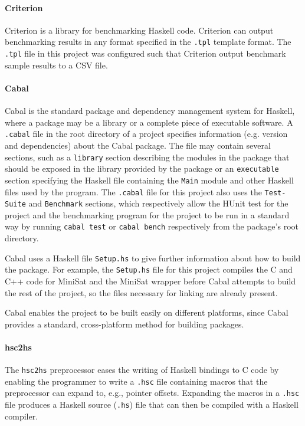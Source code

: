 \documentclass[12pt,a4paper,twoside,openright]{report}
\begin{document}
{\paragraph{Criterion}{
Criterion \cite{criterion} is a library for benchmarking Haskell code.
Criterion can output benchmarking results in any format specified in the \verb,.tpl,
template format. The \verb,.tpl, file in this project
was configured such that Criterion output benchmark sample results to a
CSV file.}

\paragraph{Cabal}{
Cabal \cite{cabal} is the standard package and dependency management system for Haskell,
where a package may be a library or a complete piece of executable software.
A \verb,.cabal, file in the root directory of a project specifies
information (e.g. version and dependencies) about the Cabal package.
The file may contain several sections, such as a
\verb,library, section describing the modules in the package that should be
exposed in the library provided by the package or an \verb,executable, section
specifying the Haskell file containing the \verb,Main,
module and other Haskell files used by the program.
The \verb,.cabal, file for this project also uses the \verb,Test-Suite, and
\verb,Benchmark, sections, which respectively allow the HUnit test for the
project and the benchmarking program for the project to be run in a standard way
by running \verb,cabal test, or \verb,cabal bench, respectively from the
package's root directory.

Cabal uses a Haskell file \verb,Setup.hs, to give further information
about how to build the package. For example, the \verb,Setup.hs, file
for this project compiles the C and C++ code for MiniSat and the MiniSat
wrapper before Cabal attempts to build the rest of the project, so the
files necessary for linking are already present.

Cabal enables the project to be built easily on different platforms,
since Cabal provides a standard, cross-platform method for building packages.}

\paragraph{hsc2hs}{
The \verb,hsc2hs, preprocessor \cite{hsc2hs} eases the writing of Haskell bindings to C
code by enabling the programmer to write a \verb,.hsc, file containing
macros that the preprocessor can expand to, e.g., pointer offsets. Expanding
the macros in a \verb,.hsc, file produces a
Haskell source (\verb,.hs,) file that can then be compiled with a Haskell compiler.
}

}
\end{document}
